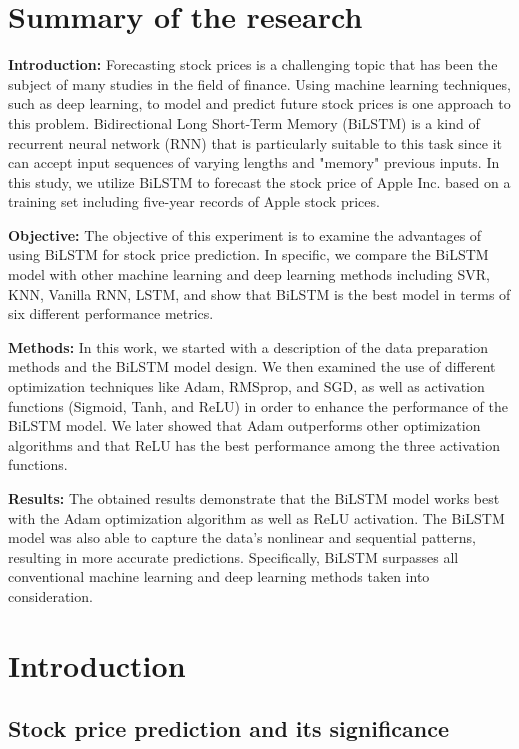 \documentclass[a4paper]{article}
\begin{document}
\pagebreak

\section{Summary of the research}
\textbf{Introduction:} Forecasting stock prices is a challenging topic that has been the subject of many studies in the field of finance. Using machine learning techniques, such as deep learning, to model and predict future stock prices is one approach to this problem. Bidirectional Long Short-Term Memory (BiLSTM) is a kind of recurrent neural network (RNN) that is particularly suitable to this task since it can accept input sequences of varying lengths and "memory" previous inputs. In this study, we utilize BiLSTM to forecast the stock price of Apple Inc. based on a training set including five-year records of Apple stock prices.

\textbf{Objective:} The objective of this experiment is to examine the advantages of using BiLSTM for stock price prediction. In specific, we compare the BiLSTM model with other machine learning and deep learning methods including SVR, KNN, Vanilla RNN, LSTM, and show that BiLSTM is the best model in terms of six different performance metrics. 

\textbf{Methods:} In this work, we started with a description of the data preparation methods and the BiLSTM model design. We then examined the use of different optimization techniques like Adam, RMSprop, and SGD, as well as activation functions (Sigmoid, Tanh, and ReLU) in order to enhance the performance of the BiLSTM model. We later showed that Adam outperforms other optimization algorithms and that ReLU has the best performance among the three activation functions.

\textbf{Results:} The obtained results demonstrate that the BiLSTM model works best with the Adam optimization algorithm as well as ReLU activation. The BiLSTM model was also able to capture the data's nonlinear and sequential patterns, resulting in more accurate predictions. Specifically, BiLSTM surpasses all conventional machine learning and deep learning methods taken into consideration.
\vfill
\pagebreak
\section{Introduction}
\subsection{Stock price prediction and its significance}
\end{document}
